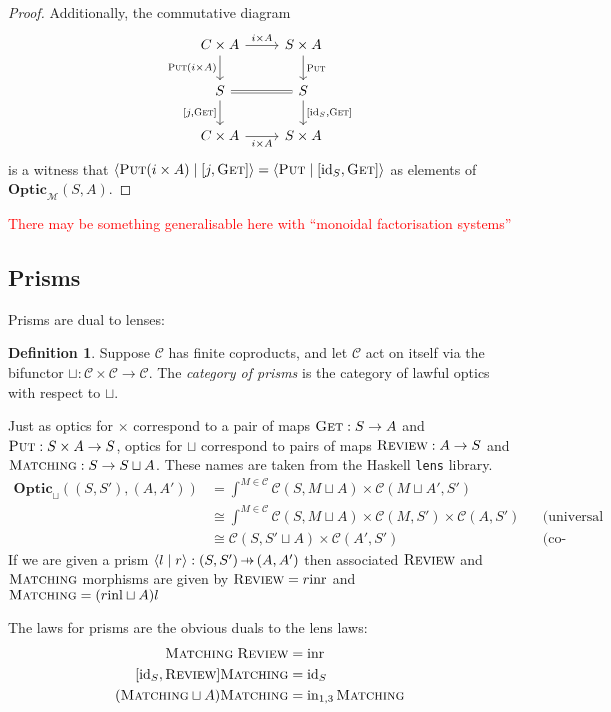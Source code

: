 \documentclass[11pt,a4paper]{article}
\theoremstyle{plain}
\theoremstyle{definition}
\newtheorem{definition}[theorem]{Definition}
\newcommand{\C}{\mathscr{C}}
\newcommand{\M}{\mathscr{M}}
\newcommand{\lenslib}{\texttt{lens}}
\newcommand{\Optic}{\mathbf{Optic}}
\newcommand{\id}{\mathrm{id}}
\newcommand{\inl}{\mathrm{inl}}
\newcommand{\inr}{\mathrm{inr}}
\newcommand{\rep}[2]{{\ensuremath \left\langle #1 \mid #2 \right\rangle}}
\newcommand{\fget}{\textsc{Get}}
\newcommand{\fput}{\textsc{Put}}
\newcommand{\freview}{\textsc{Review}}
\newcommand{\fmatching}{\textsc{Matching}}
\newcommand{\hto}{\ensuremath{\,\mathaccent\shortmid\rightarrow\,}}
\newcommand{\todo}[1]{\textcolor{red}{\small #1}}
\begin{document}
\begin{proof}
  Additionally, the commutative diagram
  \[
    \begin{tikzcd}
      C \times A \ar[r, "i \times A"] \ar[d, "\fput (i \times A)", swap] & S \times A \ar[d, "\fput"] \\
      S \ar[r, equal] \ar[d, "{[j,\fget]}", swap] & S \ar[d, "{[\id_S, \fget]}"]  \\
      C \times A \ar[r, "i \times A", swap] & S \times A
    \end{tikzcd}
  \]
  is a witness that $\rep{\fput (i \times A)}{[j,\fget] } = \rep{\fput}{[\id_S, \fget] }$ as elements of $\Optic_\M(S, A)$.
\end{proof}

\todo{There may be something generalisable here with ``monoidal factorisation systems''}

\subsection{Prisms}
Prisms are dual to lenses:

\begin{definition}
  Suppose $\C$ has finite coproducts, and let $\C$ act on itself via the bifunctor $\sqcup : \C \times \C \to \C$. The \emph{category of prisms} is the category of lawful optics with respect to $\sqcup$.
\end{definition}

Just as optics for $\times$ correspond to a pair of maps $\fget : S \to A$ and $\fput : S \times A \to S$, optics for $\sqcup$ correspond to pairs of maps $\freview : A \to S$ and $\fmatching : S \to S \sqcup A$. These names are taken from the Haskell \lenslib{} library.
\begin{align*}
  \Optic_\sqcup((S, S'), (A, A')) &= \int^{M \in \C} \C(S, M \sqcup A) \times \C(M \sqcup A', S') \\
                                  &\cong \int^{M \in \C} \C(S, M \sqcup A) \times \C(M, S') \times \C(A, S') && \text{(universal property of coproduct)} \\
                                  &\cong \C(S, S' \sqcup A) \times \C(A', S') && \text{(co-Yoneda)}
\end{align*}
If we are given a prism $\rep{l}{r } : (S, S') \hto (A, A')$ then associated $\freview$ and $\fmatching$ morphisms are given by $\freview = r \inr$ and $\fmatching = (r\inl \sqcup A)l$

The laws for prisms are the obvious duals to the lens laws:
\begin{align*}
  \fmatching \; \freview &= \inr \\
  [\id_S, \freview] \fmatching &= \id_S \\
  (\fmatching \sqcup A) \fmatching &= \mathrm{in}_{1,3} \, \fmatching
\end{align*}
\end{document}
